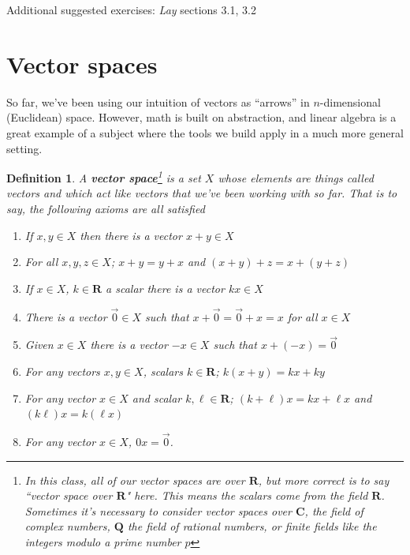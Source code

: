 \documentclass[12pt]{article}
\numberwithin{equation}{subsection}
\numberwithin{figure}{subsection}
\newtheorem{defn}[subsection]{Definition}
\theoremstyle{note}
\begin{document}
Additional suggested exercises: \textit{Lay} sections 3.1, 3.2



\section{Vector spaces} 

So far, we've been using our intuition of vectors as ``arrows'' in $n$-dimensional (Euclidean) space. However, math is built on abstraction, and linear algebra is a great example of a subject where the tools we build apply in a much more general setting. 

\begin{defn}A \textbf{vector space}\footnote{In this class, all of our vector spaces are over $\mathbf{R}$, but more correct is to say ``vector space over $\mathbf{R}$" here. This means the scalars come from the \textit{field} $\mathbf{R}$. Sometimes it's necessary to consider vector spaces over $\mathbf{C}$, the field of complex numbers,  $\mathbf{Q}$ the field of rational numbers, or \textit{finite fields} like the integers modulo a prime number $p$} is a set $X$ whose elements are things called \textit{vectors} and which act like vectors that we've been working with so far. That is to say, the following axioms are all satisfied
\begin{enumerate}
	\item If $x,y\in X$ then there is a vector $x+y\in X$
	\item For all $x,y,z\in X$; $x+y=y+x$ and $(x+y)+z=x+(y+z)$
	\item If $x\in X$, $k\in\mathbf{R}$ a scalar there is a vector $kx\in X$
	\item There is a vector $\vec{0}\in X$ such that $x+\vec{0}=\vec{0}+x=x$ for all $x\in X$
	\item Given $x\in X$ there is a vector $-x\in X$ such that $x+(-x)=\vec{0}$
	\item For any vectors $x,y\in X$, scalars $k\in\mathbf{R}$; $k(x+y)=kx+ky$
	\item For any vector $x\in X$ and scalar $k,\ell\in\mathbf{R}$; $(k+\ell)x=kx+\ell x$ and $(k\ell)x=k(\ell x)$
	\item For any vector $x\in X$, $0x=\vec{0}$. 
\end{enumerate}
\end{defn}
\end{document}
